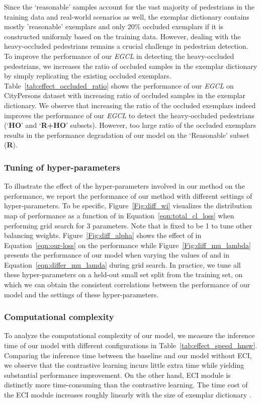 \documentclass[journal]{IEEEtran}
\begin{document}
Since the `reasonable' samples account for the vast majority of pedestrians in the training data and real-world scenarios as well, the exemplar dictionary contains mostly 'reasonable' exemplars and only 20\% occluded exemplars if it is constructed uniformly based on the training data. However, dealing with the heavy-occluded pedestrians remains a crucial challenge in pedestrian detection. To improve the performance of our \emph{EGCL} in detecting the heavy-occluded pedestrians, we increases the ratio of occluded samples in the exemplar dictionary by simply replicating the existing occluded exemplars. Table~\ref{tab:effect_occluded_ratio} shows the performance of our \emph{EGCL} on CityPersons dataset with increasing ratio of occluded samples in the exemplar dictionary. We observe that increasing the ratio of the occluded exemplars indeed improves the performance of our \emph{EGCL} to detect the heavy-occluded pedestrians (`\textbf{HO}' and `\textbf{R+HO}' subsets). However, too large ratio of the occluded exemplars results in the performance degradation of our model on the `Reasonable' subset (\textbf{R}). 







\subsubsection{\textbf{Tuning of hyper-parameters}}
To illustrate the effect of the hyper-parameters involved in our method on the performance, we report the performance of our method with different settings of hyper-parameters. To be specific, Figure~\ref{Fig:diff_wi} visualizes the distribution map of performance as a function of  in Equation~\ref{eqn:total_cl_loss} when performing grid search for 3 parameters. Note that  is fixed to be 1 to tune other balancing weights. Figure~\ref{Fig:diff_alpha} shows the effect of  in Equation~\ref{eqn:our-loss} on the performance while Figure~\ref{Fig:diff_mu_lambda} presents the performance of our model when varying the values of  and  in Equation~\ref{eqn:differ_mu_lamda} during grid search. In practice, we tune all these hyper-parameters on a held-out small set split from the training set, on which we can obtain the consistent correlations between the performance of our model and the settings of these hyper-parameters.

\subsubsection{\textbf{Computational complexity}} 
To analyze the computational complexity of our model, we measure the inference time of our model with different configurations in Table~\ref{tab:effect_speed_hnsw}. Comparing the inference time between the baseline and our model without ECI, we observe that the contrastive learning incurs little extra time while yielding substantial performance improvement. On the other hand, ECI module is distinctly more time-consuming than the contrastive learning. The time cost of the ECI module increases roughly linearly with the size of exemplar dictionary .
\end{document}
